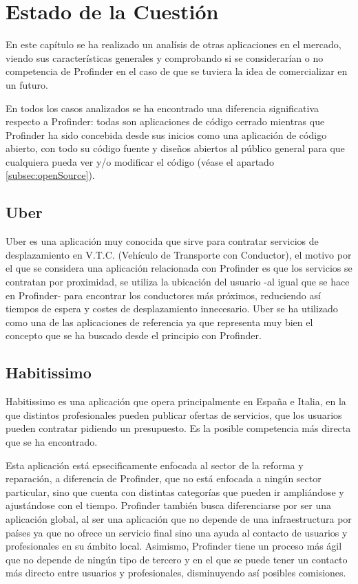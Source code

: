 \chapter{Estado de la Cuestión}
\label{cap:estadoDeLaCuestion}
En este capítulo se ha realizado un analísis de otras aplicaciones en el mercado, viendo sus características generales y comprobando si se considerarían o no competencia de Profinder en el caso de que se tuviera la idea de comercializar en un futuro. 

En todos los casos analizados se ha encontrado una diferencia significativa respecto a Profinder: todas son aplicaciones de código cerrado mientras que Profinder ha sido concebida desde sus inicios como una aplicación de código abierto, con todo su código fuente y diseños abiertos al público general para que cualquiera pueda ver y/o modificar el código (véase el apartado \ref{subsec:openSource}).
\section{Uber}
Uber\hyperlink{cap:biblio}{}
 es una aplicación muy conocida que sirve para contratar servicios de desplazamiento en V.T.C. (Vehículo de Transporte con Conductor), el motivo por el que se considera una aplicación relacionada con Profinder es que los servicios se contratan por proximidad, se utiliza la ubicación del usuario -al igual que se hace en Profinder- para encontrar los conductores más próximos, reduciendo así tiempos de espera y costes de desplazamiento innecesario. Uber se ha utilizado como una de las aplicaciones de referencia ya que representa muy bien el concepto que se ha buscado desde el principio con Profinder.
\newpage
\section{Habitissimo}
Habitissimo\hyperlink{cap:biblio}{}
es una aplicación que opera principalmente en España e Italia, en la que distintos profesionales pueden publicar ofertas de servicios, que los usuarios pueden contratar pidiendo un presupuesto. Es la posible competencia más directa que se ha encontrado. 

Esta aplicación está epsecificamente enfocada al sector de la reforma y reparación, a diferencia de Profinder, que no está enfocada a ningún sector particular, sino que cuenta con distintas categorías que pueden ir ampliándose y ajustándose con el tiempo. Profinder también busca diferenciarse por ser una aplicación global, al ser una aplicación que no depende de una infraestructura por países ya que no ofrece un servicio final sino una ayuda al contacto de usuarios y profesionales en su ámbito local. Asimismo, Profinder tiene un proceso más ágil que no depende de ningún tipo de tercero y en el que se puede tener un contacto más directo entre usuarios y profesionales, disminuyendo así posibles comisiones.
